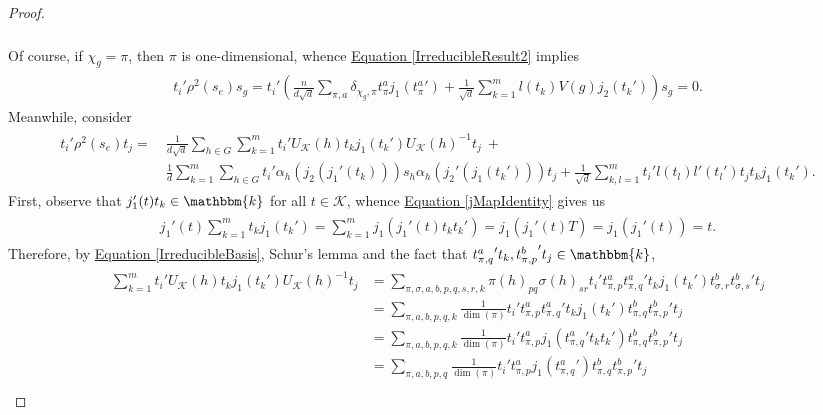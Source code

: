 \begin{proof}
\begin{align*}
\begin{split}
\end{split}
\end{align*}
\noindent Of course, if $\chi_g = \pi$, then $\pi$ is one-dimensional, whence \hyperref[IrreducibleResult2]{Equation \eqref*{IrreducibleResult2}} implies
\begin{align*}
\begin{split}
t_i'\rho^2(s_e)s_g = t_i'\left(\frac{n}{d\sqrt{d}}\sum_{\pi,a}\delta_{\chi_g,\pi}t_{\pi}^a j_1({t_{\pi}^a}') + \frac{1}{\sqrt{d}}\sum_{k=1}^m l(t_k)V(g)j_2(t_k')\right)s_g = 0.
\end{split}
\end{align*}
\noindent Meanwhile, consider
\begin{align*}
\begin{split}
t_i'\rho^2(s_e)t_j =\ &\frac{1}{d\sqrt{d}}\sum_{h \in G}\sum_{k=1}^m t_i'U_\mathcal{K}(h)t_kj_1(t_k')U_\mathcal{K}(h)^{-1}t_j\ +\\
&\frac{1}{d}\sum_{k=1}^m\sum_{h \in G} t_i'\alpha_h(j_2(j_1'(t_k)))s_h\alpha_h(j_2'(j_1(t_k')))t_j + \frac{1}{\sqrt{d}}\sum_{k,l=1}^m t_i'l(t_l)l'(t_l')t_jt_kj_1(t_k').
\end{split}
\end{align*}
\noindent First, observe that $j_1'(t)t_k \in \mathbbm{k}$ for all $t \in \mathcal{K}$, whence \hyperref[jMapIdentity]{Equation \eqref*{jMapIdentity}} gives us
\begin{align*}
\begin{split}
j_1'(t)\sum_{k=1}^m t_kj_1(t_k') = \sum_{k=1}^m j_1(j_1'(t)t_kt_k') = j_1(j_1'(t)T) = j_1(j_1'(t)) = t.
\end{split}
\end{align*}
\noindent Therefore, by \hyperref[IrreducibleBasis]{Equation \eqref*{IrreducibleBasis}}, Schur's lemma and the fact that ${t_{\pi,q}^a}'t_k, {t_{\pi,p}^b}'t_j \in \mathbbm{k}$,
\begin{align*}
\begin{split}
\sum_{k=1}^m t_i'U_\mathcal{K}(h)t_kj_1(t_k')U_\mathcal{K}(h)^{-1}t_j &= \sum_{\pi,\sigma,a,b,p,q,s,r,k} \pi(h)_{pq}\sigma(h)_{sr}t_i't_{\pi,p}^a{t_{\pi,q}^a}'t_kj_1(t_k')t_{\sigma,r}^b{t_{\sigma,s}^b}'t_j\\
&= \sum_{\pi,a,b,p,q,k} \frac{1}{\dim(\pi)}t_i't_{\pi,p}^a{t_{\pi,q}^a}'t_kj_1(t_k')t_{\pi,q}^b{t_{\pi,p}^b}'t_j\\
&= \sum_{\pi,a,b,p,q,k} \frac{1}{\dim(\pi)}t_i't_{\pi,p}^aj_1({t_{\pi,q}^a}'t_kt_k')t_{\pi,q}^b{t_{\pi,p}^b}'t_j\\
&= \sum_{\pi,a,b,p,q} \frac{1}{\dim(\pi)}t_i't_{\pi,p}^aj_1({t_{\pi,q}^a}')t_{\pi,q}^b{t_{\pi,p}^b}'t_j\\

\end{split}
\end{align*}
\end{proof}
